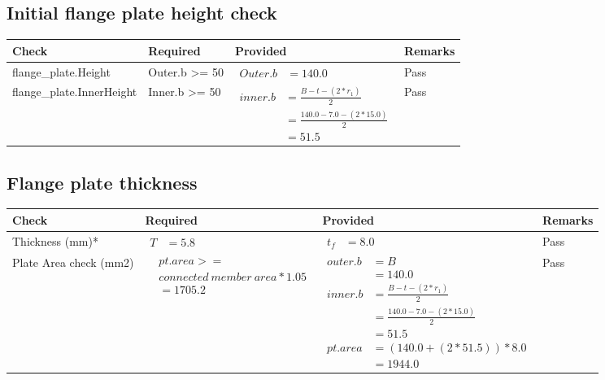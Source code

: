 \documentclass{article}%
\begin{document}
%
\newpage%
\subsection{Initial flange plate height check}%
\label{subsec:Initialflangeplateheightcheck}%
\renewcommand{\arraystretch}{1.2}%
\begin{longtable}{|p{4.5cm}|p{2.5cm}|p{7cm}|p{1.5cm}|}%
\hline%
\rowcolor{OsdagGreen}%
Check&Required&Provided&Remarks\\%
\hline%
\endhead%
\hline%
flange\_plate.Height&Outer.b >= 50&$\begin{aligned} Outer.b &=140.0\end{aligned}$&Pass\\%
\hline%
flange\_plate.InnerHeight&Inner.b >= 50&$\begin{aligned} inner.b &= \frac{B-t-(2*r_1)}{2}\\ &=\frac{140.0-7.0-(2*15.0)}{2}\\ &= 51.5\end{aligned}$&Pass\\%
\hline%
\end{longtable}

%
\newpage%
\subsection{Flange plate thickness}%
\label{subsec:Flangeplatethickness}%
\renewcommand{\arraystretch}{1.2}%
\begin{longtable}{|p{2.5cm}|p{4.5cm}|p{7cm}|p{1.5cm}|}%
\hline%
\rowcolor{OsdagGreen}%
Check&Required&Provided&Remarks\\%
\hline%
\endhead%
\hline%
Thickness (mm)*&$\begin{aligned} T &=5.8\end{aligned}$&$\begin{aligned} t_f &=8.0\end{aligned}$&Pass\\%
\hline%
Plate Area check (mm2)&$\begin{aligned} &pt.area >= \\&connected~member~area * 1.05\\  &= 1705.2\end{aligned}$&$\begin{aligned} outer.b &= B\\ &= 140.0 \\ inner.b &= \frac{B-t-(2*r_1)}{2}\\ &=\frac{140.0-7.0-(2*15.0)}{2}\\ &= 51.5 \\  pt.area &=(140.0+(2*51.5))*8.0\\ &= 1944.0\end{aligned}$&Pass\\%
\hline%
\end{longtable}
\end{document}
